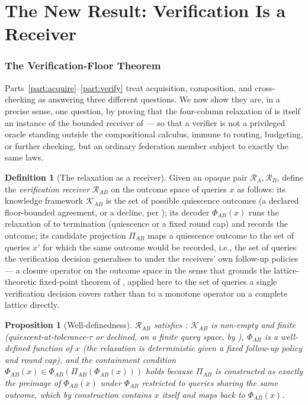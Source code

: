 \documentclass[11pt,twocolumn,a4paper]{article}
\theoremstyle{rdm}
\newtheorem{proposition}[theorem]{Proposition}
\theoremstyle{definition}
\newtheorem{definition}[theorem]{Definition}
\theoremstyle{remark}
\newcommand{\Rec}{\mathcal{R}}
\newcommand{\Know}{\mathcal{K}}
\begin{document}
\part{The New Result: Verification Is a Receiver}
\label{part:new}

\section{The Verification-Floor Theorem}
\label{sec:extension}

Parts~\ref{part:acquire}--\ref{part:verify} treat acquisition, composition,
and cross-checking as answering three different questions. We now show they
are, in a precise sense, one question, by proving that the four-column
relaxation of  is itself an instance of the bounded
receiver of  --- so that a verifier is not a privileged
oracle standing outside the compositional calculus, immune to routing,
budgeting, or further checking, but an ordinary federation member subject to
exactly the same laws.

\begin{definition}[The relaxation as a receiver]
\label{def:relax-receiver}
Given an opaque pair $\Rec_A,\Rec_B$, define the \emph{verification receiver}
$\Rec_{AB}$ on the outcome space of queries $x$ as follows: its knowledge
framework $\Know_{AB}$ is the set of possible quiescence outcomes (a
declared floor-bounded agreement, or a decline, per
); its decoder $\Phi_{AB}(x)$ runs the relaxation of
 to termination (quiescence or a fixed round cap) and
records the outcome; its candidate projection $\Pi_{AB}$ maps a quiescence
outcome to the set of queries $x'$ for which the same outcome would be
recorded, i.e., the set of queries the verification decision generalises to
under the receivers' own follow-up policies --- a closure operator on the
outcome space in the sense that grounds the lattice-theoretic fixed-point
theorem of \citet{tarski1955}, applied here to the set of queries a single
verification decision covers rather than to a monotone operator on a
complete lattice directly.
\end{definition}

\begin{proposition}[Well-definedness]
\label{prop:relax-welldef}
$\Rec_{AB}$ satisfies : $\Know_{AB}$ is non-empty and
finite (quiescent-at-tolerance-$\tau$ or declined, on a finite query space,
by ), $\Phi_{AB}$ is a well-defined function of
$x$ (the relaxation is deterministic given a fixed follow-up policy and
round cap), and the containment condition
$\Phi_{AB}(x)\in\Phi_{AB}(\Pi_{AB}(\Phi_{AB}(x)))$ holds because
$\Pi_{AB}$ is constructed as exactly the preimage of $\Phi_{AB}(x)$ under
$\Phi_{AB}$ restricted to queries sharing the same outcome, which by
construction contains $x$ itself and maps back to $\Phi_{AB}(x)$.
\end{proposition}
\end{document}
